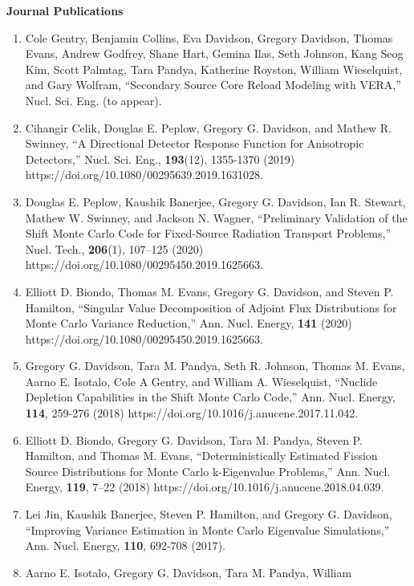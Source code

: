 \documentclass[letterpaper,11pt]{article}
\newlength{\outerbordwidth}
\newcommand{\resheading}[1]{\vspace{8pt}
  \parbox{\textwidth}{\setlength{\FrameSep}{\outerbordwidth}
    \begin{shaded}
      \setlength{\fboxsep}{0pt}\framebox[\textwidth][l]{\setlength{\fboxsep}{4pt}\fcolorbox{shadecolorB}{shadecolorB}{\textbf{\sffamily{\mbox{~}\makebox[6.762in][l]{\large #1} \vphantom{p\^{E}}}}}}
    \end{shaded}
  }\vspace{-5pt}
}
\newcommand{\leftsubheading}[1]{
  \textbf{#1\vspace{-6pt} \\}}
\begin{document}
\resheading{Publications}

\leftsubheading{Journal Publications}
\begin{enumerate}
  \item Cole Gentry, Benjamin Collins, Eva Davidson, Gregory Davidson,
    Thomas Evans, Andrew Godfrey, Shane Hart, Gemina Ilas, Seth
    Johnson, Kang Seog Kim, Scott Palmtag, Tara Pandya, Katherine
    Royston, William Wieselquist, and Gary Wolfram, ``Secondary Source
    Core Reload Modeling with VERA,'' Nucl. Sci. Eng. (to appear).
  \item Cihangir Celik, Douglas E. Peplow, Gregory G. Davidson, and
    Mathew R. Swinney, ``A Directional Detector Response Function for
    Anisotropic Detectors,'' Nucl. Sci. Eng., \textbf{193}(12),
    1355-1370 (2019) https://doi.org/10.1080/00295639.2019.1631028.
  \item Douglas E. Peplow, Kaushik Banerjee, Gregory G. Davidson, Ian
    R. Stewart, Mathew W. Swinney, and Jackson N. Wagner, ``Preliminary
    Validation of the Shift Monte Carlo Code for Fixed-Source
    Radiation Transport Problems,'' Nucl. Tech., \textbf{206}(1),
    107--125 (2020) https://doi.org/10.1080/00295450.2019.1625663.
  \item Elliott D. Biondo, Thomas M. Evans, Gregory G. Davidson, and
    Steven P. Hamilton, ``Singular Value Decomposition of Adjoint Flux
    Distributions for Monte Carlo Variance Reduction,''
    Ann. Nucl. Energy, \textbf{141} (2020)
    https://doi.org/10.1080/00295450.2019.1625663. 
  \item Gregory G. Davidson, Tara M. Pandya, Seth R. Johnson, Thomas
    M. Evans, Aarno E. Isotalo, Cole A Gentry, and William
    A. Wieselquist, ``Nuclide Depletion Capabilities in the Shift Monte
    Carlo Code,'' Ann. Nucl. Energy, \textbf{114}, 259-276 (2018)
    https://doi.org/10.1016/j.anucene.2017.11.042.
  \item Elliott D. Biondo, Gregory G. Davidson, Tara M. Pandya,
    Steven P. Hamilton, and Thomas M. Evans, ``Deterministically
    Estimated Fission Source Distributions for Monte Carlo
    k-Eigenvalue Problems,'' Ann. Nucl. Energy, \textbf{119}, 7--22
    (2018) https://doi.org/10.1016/j.anucene.2018.04.039.
  \item Lei Jin, Kaushik Banerjee, Steven P. Hamilton, and Gregory
    G. Davidson, ``Improving Variance Estimation in Monte Carlo
    Eigenvalue Simulations,'' Ann. Nucl. Energy, \textbf{110}, 692-708
    (2017). 
  \item Aarno E. Isotalo, Gregory G. Davidson, Tara M. Pandya, William

\end{enumerate}
\end{document}
